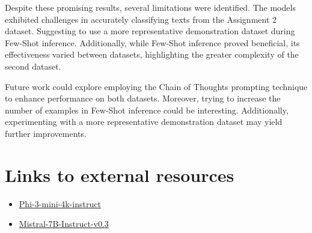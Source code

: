 \documentclass[11pt]{article}
\begin{document}
Despite these promising results, several limitations were identified. The models exhibited challenges in accurately classifying texts from the Assignment 2 dataset. Suggesting to use a more representative demonstration dataset during Few-Shot inference. Additionally, while Few-Shot inference proved beneficial, its effectiveness varied between datasets, highlighting the greater complexity of the second dataset.

Future work could explore employing the Chain of Thoughts prompting technique to enhance performance on both datasets. Moreover, trying to increase the number of examples in Few-Shot inference could be interesting. Additionally, experimenting with a more representative demonstration dataset may yield further improvements.





\section{Links to external resources}
\label{sec:links}
\explanation{
}

\begin{itemize}
    \item \href{https://huggingface.co/microsoft/Phi-3-mini-4k-instruct}{
Phi-3-mini-4k-instruct }
    \item \href{https://huggingface.co/mistralai/Mistral-7B-Instruct-v0.3}{
Mistral-7B-Instruct-v0.3}
\end{itemize}






\end{document}
